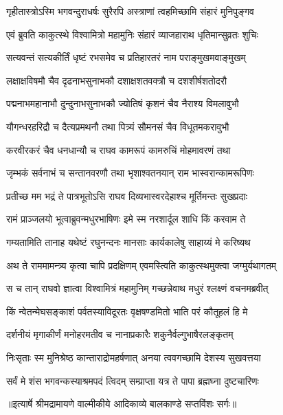 \twolineshloka
{गृहीतास्त्रोऽस्मि भगवन्दुराधर्षः सुरैरपि}
{अस्त्राणां त्वहमिच्छामि संहारं मुनिपुङ्गव} %

\twolineshloka
{एवं ब्रुवति काकुत्स्थे विश्वामित्रो महामुनिः}
{संहारं व्याजहाराथ धृतिमान्सुव्रतः शुचिः} %

\twolineshloka
{सत्यवन्तं सत्यकीर्तिं धृष्टं रभसमेव च}
{प्रतिहारतरं नाम पराङ्मुखमवाङ्मुखम्} %

\twolineshloka
{लक्षाक्षविषमौ चैव दृढनाभसुनाभकौ}
{दशाक्षशतवक्त्रौ च दशशीर्षशतोदरौ} %

\twolineshloka
{पद्मनाभमहानाभौ दुन्दुनाभसुनाभकौ}
{ज्योतिषं कृशनं चैव नैराश्य विमलावुभौ} %

\twolineshloka
{यौगन्धरहरिद्रौ च दैत्यप्रमथनौ तथा}
{पित्र्यं सौमनसं चैव विधूतमकरावुभौ} %

\twolineshloka
{करवीरकरं चैव धनधान्यौ च राघव}
{कामरूपं कामरुचिं मोहमावरणं तथा} %

\twolineshloka
{जृम्भकं सर्वनाभं च सन्तानवरणौ तथा}
{भृशाश्वतनयान् राम भास्वरान्कामरूपिणः} %

\twolineshloka
{प्रतीच्छ मम भद्रं ते पात्रभूतोऽसि राघव}
{दिव्यभास्वरदेहाश्च मूर्तिमन्तः सुखप्रदाः} %

\twolineshloka
{रामं प्राञ्जलयो भूत्वाब्रुवन्मधुरभाषिणः}
{इमे स्म नरशार्दूल शाधि किं करवाम ते} %

\twolineshloka
{गम्यतामिति तानाह यथेष्टं रघुनन्दनः}
{मानसाः कार्यकालेषु साहाय्यं मे करिष्यथ} %

\twolineshloka
{अथ ते राममामन्त्र्य कृत्वा चापि प्रदक्षिणम्}
{एवमस्त्विति काकुत्स्थमुक्त्वा जग्मुर्यथागतम्} %

\twolineshloka
{स च तान् राघवो ज्ञात्वा विश्वामित्रं महामुनिम्}
{गच्छन्नेवाथ मधुरं श्लक्ष्णं वचनमब्रवीत्} %

\twolineshloka
{किं न्वेतन्मेघसङ्काशं पर्वतस्याविदूरतः}
{वृक्षषण्डमितो भाति परं कौतूहलं हि मे} %

\twolineshloka
{दर्शनीयं मृगाकीर्णं मनोहरमतीव च}
{नानाप्रकारैः शकुनैर्वल्गुभाषैरलङ्कृतम्} %

\twolineshloka
{निःसृताः स्म मुनिश्रेष्ठ कान्ताराद्रोमहर्षणात्}
{अनया त्ववगच्छामि देशस्य सुखवत्तया} %

\twolineshloka
{सर्वं मे शंस भगवन्कस्याश्रमपदं त्विदम्}
{सम्प्राप्ता यत्र ते पापा ब्रह्मघ्ना दुष्टचारिणः} %


{॥इत्यार्षे श्रीमद्रामायणे वाल्मीकीये आदिकाव्ये बालकाण्डे सप्तविंशः सर्गः॥}


